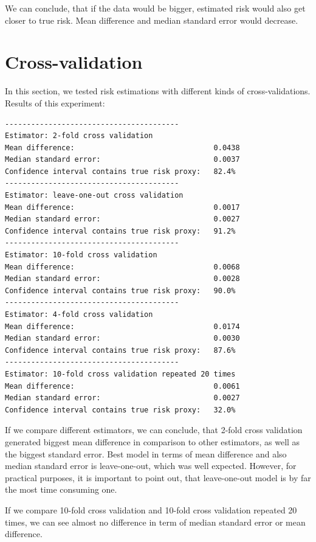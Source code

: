 \documentclass{article}
\begin{document}
We can conclude, that if the data would be bigger, estimated risk would also get closer to true risk. Mean difference and median standard error would decrease.

\section{Cross-validation}

In this section, we tested risk estimations with different kinds of cross-validations. Results of this experiment:

\begin{lstlisting}[basicstyle=\small\ttfamily]
----------------------------------------
Estimator: 2-fold cross validation
Mean difference:                                0.0438
Median standard error:                          0.0037
Confidence interval contains true risk proxy:   82.4%
----------------------------------------
Estimator: leave-one-out cross validation
Mean difference:                                0.0017
Median standard error:                          0.0027
Confidence interval contains true risk proxy:   91.2%
----------------------------------------
Estimator: 10-fold cross validation
Mean difference:                                0.0068
Median standard error:                          0.0028
Confidence interval contains true risk proxy:   90.0%
----------------------------------------
Estimator: 4-fold cross validation
Mean difference:                                0.0174
Median standard error:                          0.0030
Confidence interval contains true risk proxy:   87.6%
----------------------------------------
Estimator: 10-fold cross validation repeated 20 times
Mean difference:                                0.0061
Median standard error:                          0.0027
Confidence interval contains true risk proxy:   32.0%
\end{lstlisting}

If we compare different estimators, we can conclude, that 2-fold cross validation generated biggest mean difference in comparison to other estimators, as well as the biggest standard error. Best model in terms of mean difference and also median standard error is leave-one-out, which was well expected. However, for practical purposes, it is important to point out, that leave-one-out model is by far the most time consuming one. 

If we compare 10-fold cross validation and 10-fold cross validation repeated 20 times, we can see almost no difference in term of median standard error or mean difference.
\end{document}
